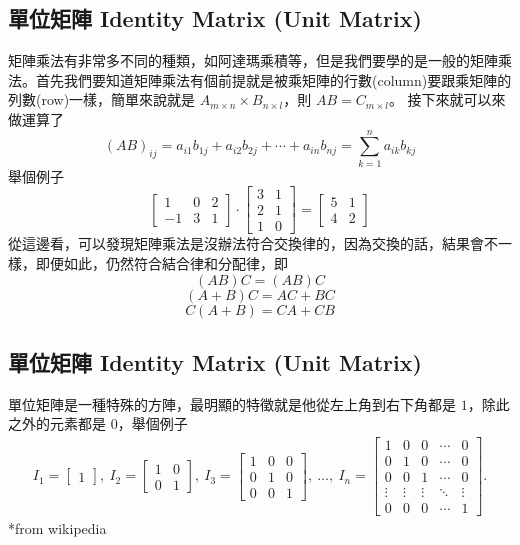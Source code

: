 \documentclass[11pt]{article}
\begin{document}
\subsection{單位矩陣 Identity Matrix (Unit Matrix)}
矩陣乘法有非常多不同的種類，如阿達瑪乘積等，但是我們要學的是一般的矩陣乘法。首先我們要知道矩陣乘法有個前提就是被乘矩陣的行數(column)要跟乘矩陣的列數(row)一樣，簡單來說就是 $A_{m \times n} \times B_{n \times l}$，則 $AB = C_{m\times l}$。
接下來就可以來做運算了
\[
  (AB)_{ij} = a_{i1}b_{1j} + a_{i2}b_{2j} + \cdots + a_{in}b_{nj} = \sum_{k = 1}^n{a_{ik}b_{kj}}
\]
舉個例子
\[
  \begin{bmatrix}
      1 & 0 & 2 \\
      -1 & 3 & 1
  \end{bmatrix}
  \cdot
    \begin{bmatrix}
      3 & 1 \\
      2 & 1 \\
      1 & 0
    \end{bmatrix}
  =
  \begin{bmatrix}
      5 & 1 \\
      4 & 2
  \end{bmatrix}
\]
從這邊看，可以發現矩陣乘法是沒辦法符合交換律的，因為交換的話，結果會不一樣，即便如此，仍然符合結合律和分配律，即 \newline
\[
  (AB)C = (AB)C
\]
\[
  (A+B)C = AC+BC
\]
\[
  C(A+B) = CA + CB
\]
\subsection{單位矩陣 Identity Matrix (Unit Matrix)}
單位矩陣是一種特殊的方陣，最明顯的特徵就是他從左上角到右下角都是 $1$，除此之外的元素都是 $0$，舉個例子
\begin{align*} 
  I_1 = \begin{bmatrix} 1 \end{bmatrix}
  ,\ 
  I_2 = \begin{bmatrix}
  1 & 0 \\
  0 & 1 \end{bmatrix}
  ,\ 
  I_3 = \begin{bmatrix}
  1 & 0 & 0 \\
  0 & 1 & 0 \\
  0 & 0 & 1 \end{bmatrix}
  ,\ \dots ,\ 
  I_n = \begin{bmatrix}
  1 & 0 & 0 & \cdots & 0 \\
  0 & 1 & 0 & \cdots & 0 \\
  0 & 0 & 1 & \cdots & 0 \\
  \vdots & \vdots & \vdots & \ddots & \vdots \\
  0 & 0 & 0 & \cdots & 1 \end{bmatrix}.
\end{align*}
*from wikipedia \newline
\end{document}

